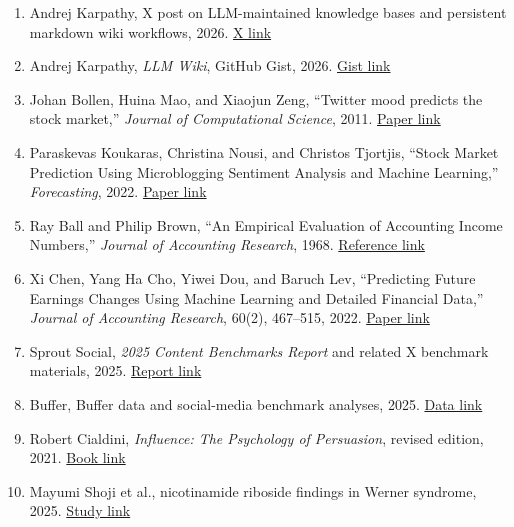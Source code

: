 \documentclass[11pt, a4paper]{article}
\begin{document}
\begin{enumerate}[leftmargin=1.5em, itemsep=0.35em]
    \item Andrej Karpathy, X post on LLM-maintained knowledge bases and persistent markdown wiki workflows, 2026. \href{https://x.com/karpathy/status/2039805659525644595?s=20}{X link}
    \item Andrej Karpathy, \textit{LLM Wiki}, GitHub Gist, 2026. \href{https://gist.github.com/karpathy/442a6bf555914893e9891c11519de94f}{Gist link}
    \item Johan Bollen, Huina Mao, and Xiaojun Zeng, ``Twitter mood predicts the stock market,'' \textit{Journal of Computational Science}, 2011. \href{https://arxiv.org/abs/1010.3003}{Paper link}
    \item Paraskevas Koukaras, Christina Nousi, and Christos Tjortjis, ``Stock Market Prediction Using Microblogging Sentiment Analysis and Machine Learning,'' \textit{Forecasting}, 2022. \href{https://doaj.org/article/c751541e5b864b4091a170efcb5b3838}{Paper link}
    \item Ray Ball and Philip Brown, ``An Empirical Evaluation of Accounting Income Numbers,'' \textit{Journal of Accounting Research}, 1968. \href{https://ideas.repec.org/a/bla/joares/v6y1968i2p159-178.html}{Reference link}
    \item Xi Chen, Yang Ha Cho, Yiwei Dou, and Baruch Lev, ``Predicting Future Earnings Changes Using Machine Learning and Detailed Financial Data,'' \textit{Journal of Accounting Research}, 60(2), 467--515, 2022. \href{https://papers.ssrn.com/sol3/papers.cfm?abstract_id=3741015}{Paper link}
    \item Sprout Social, \textit{2025 Content Benchmarks Report} and related X benchmark materials, 2025. \href{https://sproutsocial.com/insights/data/content-benchmarks/}{Report link}
    \item Buffer, Buffer data and social-media benchmark analyses, 2025. \href{https://buffer.com/resources/buffer-data/}{Data link}
    \item Robert Cialdini, \textit{Influence: The Psychology of Persuasion}, revised edition, 2021. \href{https://www.influenceatwork.com/announcement/the-new-revision-of-influence/}{Book link}
    \item Mayumi Shoji et al., nicotinamide riboside findings in Werner syndrome, 2025. \href{https://investors.niagenbioscience.com/news/news-details/2025/Niagen-Bioscience-Announces-First-Ever-Peer-Reviewed-Study-Highlighting-the-Potential-of-Nicotinamide-Riboside-NR-for-Werner-Syndrome-a-Rare-Genetic-Disorder/default.aspx}{Study link}

\end{enumerate}
\end{document}
